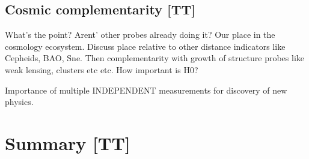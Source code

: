 \subsection{Cosmic complementarity [TT]}

What's the point? Arent' other probes already doing it? Our place in the cosmology ecosystem. Discuss place relative to other distance indicators like Cepheids, BAO, Sne. Then complementarity with growth of structure probes like weak lensing, clusters etc etc. How important is H0?

Importance of multiple INDEPENDENT measurements for discovery of new physics.


\section{Summary [TT]}
\label{sec:summary}



%
%

